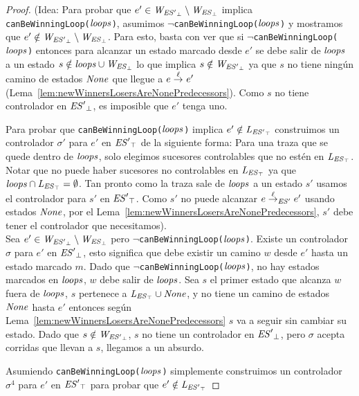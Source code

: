 \begin{proof}
	(Idea: Para probar que $e' \in \mathit{W_{\mathit{{\mathit{ES}'}_{\bot}}}} \setminus \mathit{W_{\mathit{{\mathit{ES}}_{\bot}}}}$ implica \\ \texttt{canBeWinningLoop($\mathit{loops}$)}, asumimos $\neg$\texttt{canBeWinningLoop($\mathit{loops}$)} y mostramos que $e' \notin \mathit{W_{\mathit{{\mathit{ES}'}_{\bot}}}} 
	\setminus \mathit{W_{\mathit{{\mathit{ES}}_{\bot}}}}$. Para esto, basta con ver que si
	$\neg$\texttt{canBeWinningLoop($\mathit{loops}$)} entonces para alcanzar un estado marcado desde $e'$ se debe salir de $\mathit{loops}$ a un estado $s \notin \mathit{loops} \cup \mathit{W_{\mathit{{\mathit{ES}}_{\bot}}}}$ lo que implica $s \notin \mathit{W_{\mathit{{\mathit{ES}'}_{\bot}}}}$ 
	ya que $s$ no tiene ningún camino de estados $\mathit{None}$ que llegue a $e \overset{\ell}{\rightarrow}_{} e'$  (Lema~\ref{lem:newWinnersLosersAreNonePredecessors}).
	Como $s$ no tiene controlador en $\mathit{{\mathit{ES}'}_{\bot}}$, es imposible que $e'$ tenga uno. 
	
	Para probar que \texttt{canBeWinningLoop($\mathit{loops}$)} implica $e' \notin \mathit{L_{\mathit{{\mathit{ES}'}_{\top}}}}$ construimos un controlador $\sigma'$ para $e'$ en $\mathit{{\mathit{ES}'}_{\top}}$ de la siguiente forma:
	Para una traza que se quede dentro de $\mathit{loops}$, solo elegimos sucesores controlables que no estén en $\mathit{L_{\mathit{{\mathit{ES}}_{\top}}}}$. Notar que no puede haber sucesores no controlables en $\mathit{L_{\mathit{{\mathit{ES}}_{\top}}}}$ ya que
	$\mathit{loops} \cap \mathit{L_{\mathit{{\mathit{ES}}_{\top}}}}= \emptyset$. Tan pronto como la traza sale de $\mathit{loops}$ a un estado $s'$ usamos el controlador para $s'$ en $\mathit{{\mathit{ES}'}_{\top}}$. 
	Como $s'$ no puede alcanzar $e \overset{\ell}{\rightarrow}_{\mathit{ES}'} 
	e'$ usando estados $\mathit{None}$, por el 
	Lema~\ref{lem:newWinnersLosersAreNonePredecessors}, $s'$ debe tener el controlador que necesitamos).	\\


Sea $e' \in \mathit{W_{\mathit{{\mathit{ES}'}_{\bot}}}} \setminus \mathit{W_{\mathit{{\mathit{ES}}_{\bot}}}}$ pero $\neg$\texttt{canBeWinningLoop($\mathit{loops}$)}.
Existe un controlador $\sigma$ para $e'$ en $\mathit{{\mathit{ES}'}_{\bot}}$, esto significa que debe existir un camino $w$ desde $e'$ hasta un estado marcado $m$. 
Dado que $\neg$\texttt{canBeWinningLoop($\mathit{loops}$)}, no hay estados marcados en $\mathit{loops}$, $w$ debe salir de $\mathit{loops}$. 
Sea $s$ el primer estado que alcanza $w$ fuera de $\mathit{loops}$, $s$ pertenece a $\mathit{L_{\mathit{{\mathit{ES}}_{\top}}}} \cup \mathit{None}$, y no tiene un camino de estados $\mathit{None}$ hasta $e'$ entonces según Lema~\ref{lem:newWinnersLosersAreNonePredecessors} $s$ va a seguir sin cambiar su estado.
Dado que $s \notin \mathit{W_{\mathit{{\mathit{ES}'}_{\bot}}}}$, $s$ no tiene un controlador en $\mathit{{\mathit{ES}'}_{\bot}}$, pero $\sigma$ acepta corridas que llevan a $s$, llegamos a un absurdo.

Asumiendo \texttt{canBeWinningLoop($\mathit{loops}$)} simplemente construimos un controlador $\sigma^4$ para $e'$ en $\mathit{{\mathit{ES}'}_{\top}}$ para probar que $e' \notin \mathit{L_{\mathit{{\mathit{ES}'}_{\top}}}}$


\end{proof}

